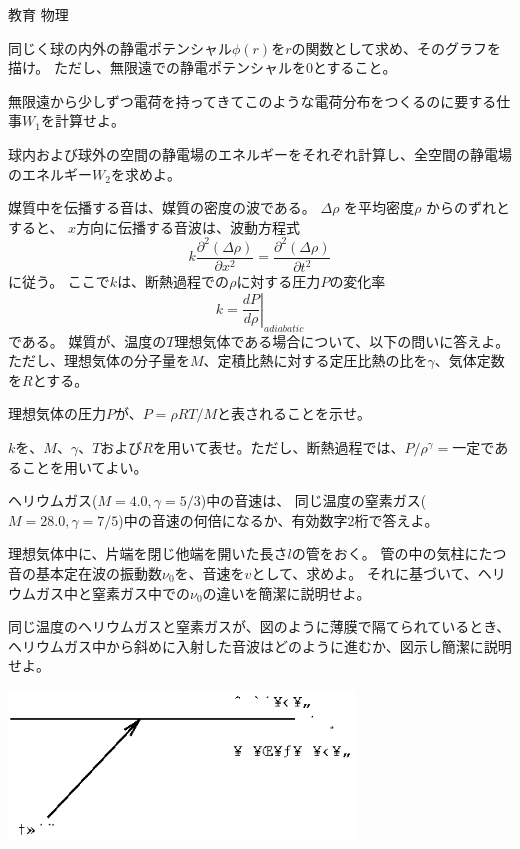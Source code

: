 \documentclass[fleqn]{jbook}
\begin{document}
\begin{question}{教育 物理}{}
\begin{subquestions}
\begin{subsubquestions}
\SubSubQuestion
同じく球の内外の静電ポテンシャル$\phi(r)$を$r$の関数として求め、そのグラフを描け。
ただし、無限遠での静電ポテンシャルを$0$とすること。

\SubSubQuestion
 無限遠から少しずつ電荷を持ってきてこのような電荷分布をつくるのに要する仕事$W_{1}$を計算せよ。

\SubSubQuestion
球内および球外の空間の静電場のエネルギーをそれぞれ計算し、全空間の静電場のエネルギー$W_{2}$を求めよ。
\end{subsubquestions}

\SubQuestion

媒質中を伝播する音は、媒質の密度の波である。
$\Delta \rho $ を平均密度$\rho$ からのずれとすると、
$x$方向に伝播する音波は、波動方程式
\[
k\frac{\partial^{2}(\Delta \rho)}{\partial x^{2}}
=\frac{\partial^{2}(\Delta \rho)}{\partial t^{2}}
\]
に従う。
ここで$k$は、断熱過程での$\rho$に対する圧力$P$の変化率
\[
k=\left.\frac{dP}{d\rho}\right|_{adiabatic}
\]
である。
媒質が、温度の$T$理想気体である場合について、以下の問いに答えよ。
ただし、理想気体の分子量を$M$、定積比熱に対する定圧比熱の比を$\gamma$、気体定数を$R$とする。

\begin{subsubquestions}
\SubSubQuestion
理想気体の圧力$P$が、$P=\rho R T /M$と表されることを示せ。

\SubSubQuestion
$k$を、$M$、$\gamma$、$T$および$R$を用いて表せ。ただし、断熱過程では、$P/\rho^{\gamma}=$一定であることを用いてよい。

\SubSubQuestion
ヘリウムガス($M=4.0,\gamma=5/3$)中の音速は、
同じ温度の窒素ガス($M=28.0,\gamma=7/5$)中の音速の何倍になるか、有効数字2桁で答えよ。

\SubSubQuestion
理想気体中に、片端を閉じ他端を開いた長さ$l$の管をおく。
管の中の気柱にたつ音の基本定在波の振動数$\nu_{0}$を、音速を$v$として、求めよ。
それに基づいて、ヘリウムガス中と窒素ガス中での$\nu_{0}$の違いを簡潔に説明せよ。

\SubSubQuestion
同じ温度のヘリウムガスと窒素ガスが、図のように薄膜で隔てられているとき、ヘリウムガス中から斜めに入射した音波はどのように進むか、図示し簡潔に説明せよ。\\

\begin{center}
\includegraphics[clip,height=4cm]{1998phys-3.eps}
\end{center}

\end{subsubquestions}
\end{subquestions}
\end{question}
\end{document}
